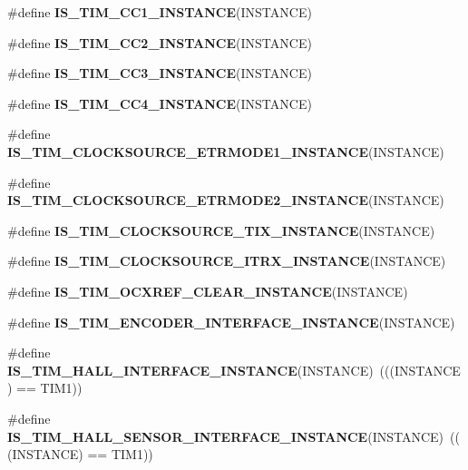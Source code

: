 \begin{DoxyCompactItemize}
\item 
\#define {\bfseries I\+S\+\_\+\+T\+I\+M\+\_\+\+C\+C1\+\_\+\+I\+N\+S\+T\+A\+N\+CE}(I\+N\+S\+T\+A\+N\+CE)
\item 
\#define {\bfseries I\+S\+\_\+\+T\+I\+M\+\_\+\+C\+C2\+\_\+\+I\+N\+S\+T\+A\+N\+CE}(I\+N\+S\+T\+A\+N\+CE)
\item 
\#define {\bfseries I\+S\+\_\+\+T\+I\+M\+\_\+\+C\+C3\+\_\+\+I\+N\+S\+T\+A\+N\+CE}(I\+N\+S\+T\+A\+N\+CE)
\item 
\#define {\bfseries I\+S\+\_\+\+T\+I\+M\+\_\+\+C\+C4\+\_\+\+I\+N\+S\+T\+A\+N\+CE}(I\+N\+S\+T\+A\+N\+CE)
\item 
\#define {\bfseries I\+S\+\_\+\+T\+I\+M\+\_\+\+C\+L\+O\+C\+K\+S\+O\+U\+R\+C\+E\+\_\+\+E\+T\+R\+M\+O\+D\+E1\+\_\+\+I\+N\+S\+T\+A\+N\+CE}(I\+N\+S\+T\+A\+N\+CE)
\item 
\#define {\bfseries I\+S\+\_\+\+T\+I\+M\+\_\+\+C\+L\+O\+C\+K\+S\+O\+U\+R\+C\+E\+\_\+\+E\+T\+R\+M\+O\+D\+E2\+\_\+\+I\+N\+S\+T\+A\+N\+CE}(I\+N\+S\+T\+A\+N\+CE)
\item 
\#define {\bfseries I\+S\+\_\+\+T\+I\+M\+\_\+\+C\+L\+O\+C\+K\+S\+O\+U\+R\+C\+E\+\_\+\+T\+I\+X\+\_\+\+I\+N\+S\+T\+A\+N\+CE}(I\+N\+S\+T\+A\+N\+CE)
\item 
\#define {\bfseries I\+S\+\_\+\+T\+I\+M\+\_\+\+C\+L\+O\+C\+K\+S\+O\+U\+R\+C\+E\+\_\+\+I\+T\+R\+X\+\_\+\+I\+N\+S\+T\+A\+N\+CE}(I\+N\+S\+T\+A\+N\+CE)
\item 
\#define {\bfseries I\+S\+\_\+\+T\+I\+M\+\_\+\+O\+C\+X\+R\+E\+F\+\_\+\+C\+L\+E\+A\+R\+\_\+\+I\+N\+S\+T\+A\+N\+CE}(I\+N\+S\+T\+A\+N\+CE)
\item 
\#define {\bfseries I\+S\+\_\+\+T\+I\+M\+\_\+\+E\+N\+C\+O\+D\+E\+R\+\_\+\+I\+N\+T\+E\+R\+F\+A\+C\+E\+\_\+\+I\+N\+S\+T\+A\+N\+CE}(I\+N\+S\+T\+A\+N\+CE)
\item 
\mbox{\label{group___exported__macro_gacdcc047699e2d83c9d2b3a3f8375dff4}} 
\#define {\bfseries I\+S\+\_\+\+T\+I\+M\+\_\+\+H\+A\+L\+L\+\_\+\+I\+N\+T\+E\+R\+F\+A\+C\+E\+\_\+\+I\+N\+S\+T\+A\+N\+CE}(I\+N\+S\+T\+A\+N\+CE)~(((I\+N\+S\+T\+A\+N\+CE) == T\+I\+M1))
\item 
\mbox{\label{group___exported__macro_ga979ea18ba0931f5ed15cc2f3ac84794b}} 
\#define {\bfseries I\+S\+\_\+\+T\+I\+M\+\_\+\+H\+A\+L\+L\+\_\+\+S\+E\+N\+S\+O\+R\+\_\+\+I\+N\+T\+E\+R\+F\+A\+C\+E\+\_\+\+I\+N\+S\+T\+A\+N\+CE}(I\+N\+S\+T\+A\+N\+CE)~(((I\+N\+S\+T\+A\+N\+CE) == T\+I\+M1))
\item 

\end{DoxyCompactItemize}

